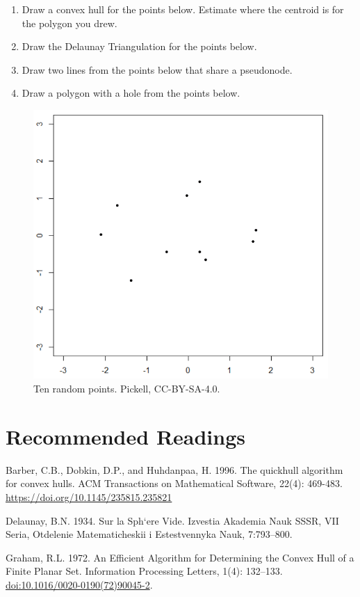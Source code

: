 \documentclass[
]{book}
\providecommand{\tightlist}{%
  \setlength{\itemsep}{0pt}\setlength{\parskip}{0pt}}
\begin{document}
\begin{enumerate}
\def\labelenumi{\arabic{enumi}.}
\tightlist
\item
  Draw a convex hull for the points below. Estimate where the centroid is for the polygon you drew.
\item
  Draw the Delaunay Triangulation for the points below.
\item
  Draw two lines from the points below that share a pseudonode.
\item
  Draw a polygon with a hole from the points below.
\end{enumerate}

\begin{figure}
\includegraphics[width=0.75\linewidth]{images/07-scatterplot} \caption{Ten random points. Pickell, CC-BY-SA-4.0.}\label{fig:7-scatterplot}
\end{figure}

\section*{Recommended Readings}\label{recommended-readings}

Barber, C.B., Dobkin, D.P., and Huhdanpaa, H. 1996. The quickhull algorithm for convex hulls. ACM Transactions on Mathematical Software, 22(4): 469-483. \url{https://doi.org/10.1145/235815.235821}

Delaunay, B.N. 1934. Sur la Sph`ere Vide. Izvestia Akademia Nauk SSSR, VII Seria, Otdelenie
Matematicheskii i Estestvennyka Nauk, 7:793--800.

Graham, R.L. 1972. An Efficient Algorithm for Determining the Convex Hull of a Finite Planar Set. Information Processing Letters, 1(4): 132--133. \url{doi:10.1016/0020-0190(72)90045-2}.
\end{document}
